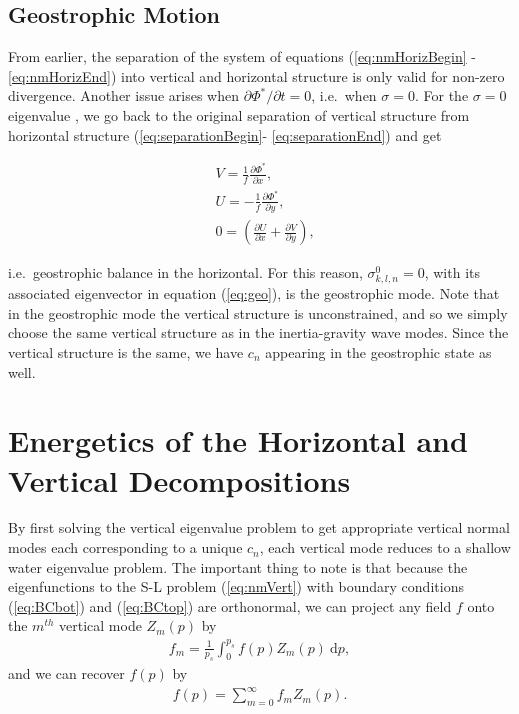 \subsection{Geostrophic Motion}
\label{sec:geostrophicMotion}
From earlier, the separation of the system of equations (\ref{eq:nmHorizBegin} - \ref{eq:nmHorizEnd}) into vertical and horizontal structure is only valid for non-zero divergence. Another issue arises when $\partial \Phi^*/\partial t = 0$, i.e.\ when $\sigma = 0$. For the $\sigma = 0$ eigenvalue , we go back to the original separation of vertical structure from horizontal structure (\ref{eq:separationBegin}- \ref{eq:separationEnd}) and get 

\begin{align}
&V = \frac{1}{f} \frac{\partial \Phi^*}{\partial x},\label{eq:geoVertBegin}\\
&U = -\frac{1}{f} \frac{\partial \Phi^*}{\partial y},\\
&0 = \left(\frac{\partial U}{\partial x} + \frac{\partial V}{\partial y}\right),\label{eq:geoVertEnd}
\end{align}

i.e.\ geostrophic balance in the horizontal. For this reason, $\sigma^0_{k,l,n} = 0$, with its associated eigenvector in equation (\ref{eq:geo}), is the geostrophic mode. Note that in the geostrophic mode the vertical structure is unconstrained, and so we simply choose the same vertical structure as in the inertia-gravity wave modes. Since the vertical structure is the same, we have $c_n$ appearing in the geostrophic state as well.

\section{Energetics of the Horizontal and Vertical Decompositions}
By first solving the vertical eigenvalue problem to get appropriate vertical normal modes each corresponding to a unique $c_n$, each vertical mode reduces to a shallow water eigenvalue problem. The important thing to note is that because the eigenfunctions to the S-L problem (\ref{eq:nmVert}) with boundary conditions (\ref{eq:BCbot}) and (\ref{eq:BCtop}) are orthonormal, we can project any field $f$ onto the $m^{th}$ vertical mode $Z_m(p)$ by 
\begin{align}
f_m = \frac{1}{p_s} \int_0^{p_s} f(p) Z_m(p) ~\text{d}p,
\end{align}
and we can recover $f(p)$ by 
\begin{align}
f(p) = \sum_{m=0}^{\infty} f_m Z_m(p) .\label{eq:reconstruction}
\end{align}

